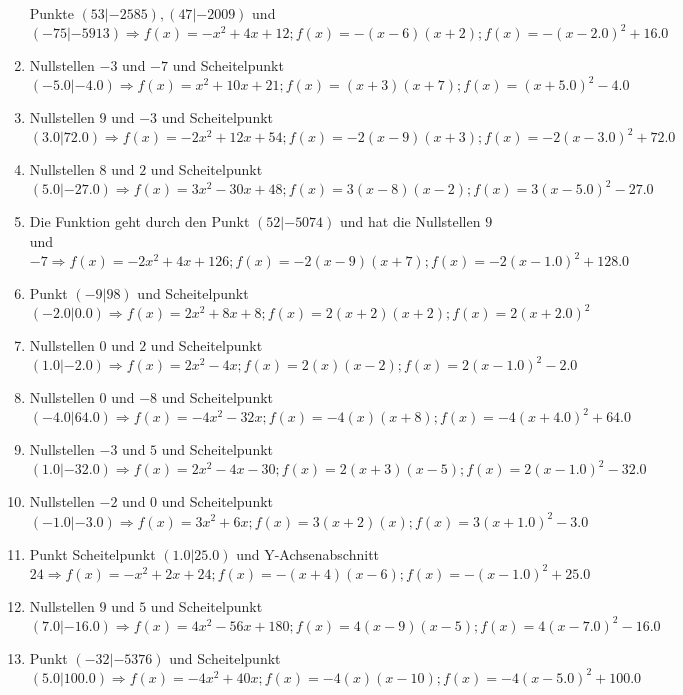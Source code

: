 \documentclass{article}%
\begin{document}
\begin{enumerate}[label=\alph*)]
 Punkte $(53|-2585),(47|-2009)$ und $(-75|-5913) \Rightarrow f(x)=-x^2 + 4x + 12 ; f(x)=-(x-6)(x+2) ; f(x)=-(x-2.0)^2 +16.0$%
\item%
 Nullstellen $-3$ und $-7$ und Scheitelpunkt $(-5.0|-4.0) \Rightarrow f(x)=x^2 + 10x + 21 ; f(x)=(x+3)(x+7) ; f(x)=(x+5.0)^2 -4.0$%
\item%
 Nullstellen $9$ und $-3$ und Scheitelpunkt $(3.0|72.0) \Rightarrow f(x)=-2x^2 + 12x + 54 ; f(x)=-2(x-9)(x+3) ; f(x)=-2(x-3.0)^2 +72.0$%
\item%
 Nullstellen $8$ und $2$ und Scheitelpunkt $(5.0|-27.0) \Rightarrow f(x)=3x^2 - 30x + 48 ; f(x)=3(x-8)(x-2) ; f(x)=3(x-5.0)^2 -27.0$%
\item%
 Die Funktion geht durch den Punkt $(52|-5074)$ und hat die Nullstellen $9$ und $-7 \Rightarrow f(x)=-2x^2 + 4x + 126 ; f(x)=-2(x-9)(x+7) ; f(x)=-2(x-1.0)^2 +128.0$%
\item%
 Punkt $(-9|98)$ und Scheitelpunkt $(-2.0|0.0) \Rightarrow f(x)=2x^2 + 8x + 8 ; f(x)=2(x+2)(x+2) ; f(x)=2(x+2.0)^2$%
\item%
 Nullstellen $0$ und $2$ und Scheitelpunkt $(1.0|-2.0) \Rightarrow f(x)=2x^2 - 4x ; f(x)=2(x)(x-2) ; f(x)=2(x-1.0)^2 -2.0$%
\item%
 Nullstellen $0$ und $-8$ und Scheitelpunkt $(-4.0|64.0) \Rightarrow f(x)=-4x^2 - 32x ; f(x)=-4(x)(x+8) ; f(x)=-4(x+4.0)^2 +64.0$%
\item%
 Nullstellen $-3$ und $5$ und Scheitelpunkt $(1.0|-32.0) \Rightarrow f(x)=2x^2 - 4x - 30 ; f(x)=2(x+3)(x-5) ; f(x)=2(x-1.0)^2 -32.0$%
\item%
 Nullstellen $-2$ und $0$ und Scheitelpunkt $(-1.0|-3.0) \Rightarrow f(x)=3x^2 + 6x ; f(x)=3(x+2)(x) ; f(x)=3(x+1.0)^2 -3.0$%
\item%
 Punkt Scheitelpunkt $(1.0|25.0)$ und Y-Achsenabschnitt $24 \Rightarrow f(x)=-x^2 + 2x + 24 ; f(x)=-(x+4)(x-6) ; f(x)=-(x-1.0)^2 +25.0$%
\item%
 Nullstellen $9$ und $5$ und Scheitelpunkt $(7.0|-16.0) \Rightarrow f(x)=4x^2 - 56x + 180 ; f(x)=4(x-9)(x-5) ; f(x)=4(x-7.0)^2 -16.0$%
\item%
 Punkt $(-32|-5376)$ und Scheitelpunkt $(5.0|100.0) \Rightarrow f(x)=-4x^2 + 40x ; f(x)=-4(x)(x-10) ; f(x)=-4(x-5.0)^2 +100.0$%
\end{enumerate}

%
\end{document}
